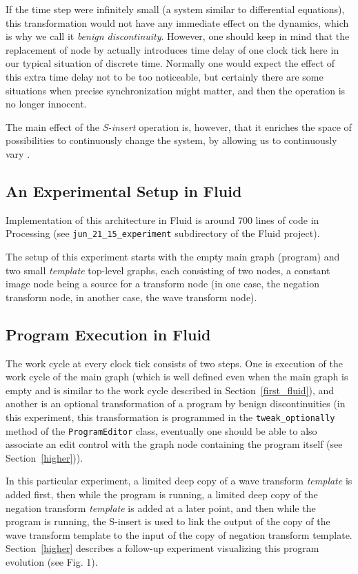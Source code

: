 \documentclass{llncs}
\begin{document}
If the time step were infinitely small (a system similar to differential equations), 
this transformation would not have any immediate effect on the dynamics, which is
why we call it {\em benign discontinuity}. However, one should keep in mind that the replacement of
node  by  actually introduces time delay of one clock tick here in our
typical situation of discrete time. Normally one would expect the effect of this
extra time delay not to be too noticeable, but certainly there are some situations
when precise synchronization might matter, and then the operation is no longer
innocent.

The main effect of the {\em S-insert} operation is, however, that it enriches the space of
possibilities to continuously change the system, by allowing us to continuously
vary . 

\subsection{An Experimental Setup in Fluid}

Implementation of this architecture in Fluid is around 700 lines of code in Processing
 (see {\tt jun\_21\_15\_experiment} subdirectory of the Fluid project).

The setup of this experiment starts with the empty main graph (program) and
two small {\em template} top-level graphs, each consisting of two nodes, a constant image node
being a source for a transform node (in one case, the negation transform node,
in another case, the wave transform node).

\subsection{Program Execution in Fluid}\label{continuous_fluid}

The work cycle at every clock tick consists of two steps. One is execution of the work cycle
of the main graph (which is well defined even when the main graph is empty and is similar to the
work cycle described in Section~\ref{first_fluid}), and another is
an optional transformation of a program by benign discontinuities (in this experiment,
this transformation is programmed in the {\tt tweak\_optionally} method of the {\tt ProgramEditor}
class, eventually one should be able to also associate an edit control with the graph node containing
the program itself (see Section~\ref{higher})).

In this particular experiment, a limited deep copy of a wave transform {\em template} is added first,
then while the program is running, a limited deep copy of the negation
transform {\em template} is added at a later point, and then while the program is running, the S-insert is used to link
the output of the copy of the wave transform template to the input of the copy of negation transform template.
Section~\ref{higher} describes a follow-up experiment visualizing this program evolution (see Fig. 1).
\end{document}
